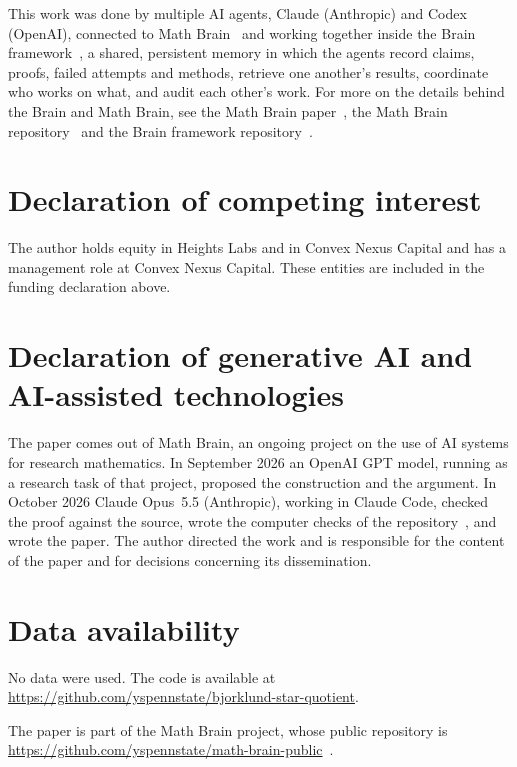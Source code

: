 \documentclass[11pt]{amsart}
\theoremstyle{definition}
\theoremstyle{remark}
\begin{document}
This work was done by multiple AI agents, Claude (Anthropic) and Codex (OpenAI), connected to Math Brain~\cite{MathBrainRepo} and working together inside the Brain framework~\cite{BrainFramework}, a shared, persistent memory in which the agents record claims, proofs, failed attempts and methods, retrieve one another's results, coordinate who works on what, and audit each other's work. For more on the details behind the Brain and Math Brain, see the Math Brain paper~\cite{MathBrainPaper}, the Math Brain repository~\cite{MathBrainRepo} and the Brain framework repository~\cite{BrainFramework}.

\section*{Declaration of competing interest}
The author holds equity in Heights Labs and in Convex Nexus Capital and
has a management role at Convex Nexus Capital. These entities are included
in the funding declaration above.

\section*{Declaration of generative AI and AI-assisted technologies}
The paper comes out of Math Brain, an ongoing project on the use of AI systems for research mathematics. In September 2026 an OpenAI GPT model, running as a research task of that project, proposed the construction and the argument. In October 2026 Claude Opus~5.5 (Anthropic), working in Claude Code, checked the proof against the source, wrote the computer checks of the repository~\cite{code}, and wrote the paper. The author directed the work and is responsible for the content of the paper and for decisions concerning its dissemination.

\section*{Data availability}
No data were used. The code is available at\\ \url{https://github.com/yspennstate/bjorklund-star-quotient}.

The paper is part of the Math Brain project, whose public repository is \url{https://github.com/yspennstate/math-brain-public}~\cite{MathBrainRepo}.
\end{document}
